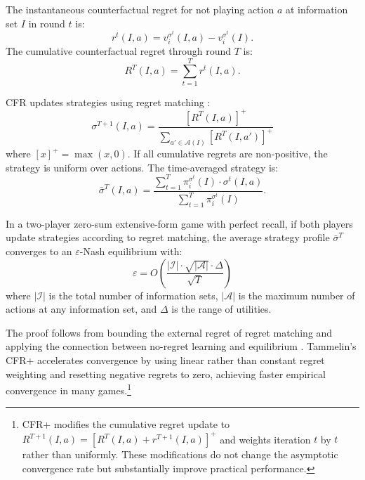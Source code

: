 \begin{definition}
The instantaneous counterfactual regret for not playing action $a$ at information set $I$ in round $t$ is:
\begin{equation}
r^t(I, a) = v^{\sigma^t}_i(I, a) - v^{\sigma^t}_i(I).
\end{equation}
The cumulative counterfactual regret through round $T$ is:
\begin{equation}
R^T(I, a) = \sum_{t=1}^{T} r^t(I, a).
\end{equation}
\end{definition}

CFR updates strategies using regret matching \citep{hart2000simple}:
\begin{equation}
\sigma^{T+1}(I, a) = \frac{[R^T(I, a)]^+}{\sum_{a' \in \mathcal{A}(I)} [R^T(I, a')]^+}
\end{equation}
where $[x]^+ = \max(x, 0)$. If all cumulative regrets are non-positive, the strategy is uniform over actions. The time-averaged strategy is:
\begin{equation}
\bar{\sigma}^T(I, a) = \frac{\sum_{t=1}^{T} \pi^{\sigma^t}_i(I) \cdot \sigma^t(I, a)}{\sum_{t=1}^{T} \pi^{\sigma^t}_i(I)}.
\end{equation}

\begin{theorem}\label{thm:cfr}
In a two-player zero-sum extensive-form game with perfect recall, if both players update strategies according to regret matching, the average strategy profile $\bar{\sigma}^T$ converges to an $\varepsilon$-Nash equilibrium with:
\begin{equation}
\varepsilon = O\left(\frac{|\mathcal{I}| \cdot \sqrt{|\mathcal{A}|} \cdot \Delta}{\sqrt{T}}\right)
\end{equation}
where $|\mathcal{I}|$ is the total number of information sets, $|\mathcal{A}|$ is the maximum number of actions at any information set, and $\Delta$ is the range of utilities.
\end{theorem}

The proof follows from bounding the external regret of regret matching and applying the connection between no-regret learning and equilibrium \citep{zinkevich2008}. Tammelin's CFR+ \citep{tammelin2014solving} accelerates convergence by using linear rather than constant regret weighting and resetting negative regrets to zero, achieving faster empirical convergence in many games.\footnote{CFR+ modifies the cumulative regret update to $R^{T+1}(I, a) = [R^T(I, a) + r^{T+1}(I, a)]^+$ and weights iteration $t$ by $t$ rather than uniformly. These modifications do not change the asymptotic convergence rate but substantially improve practical performance.}

